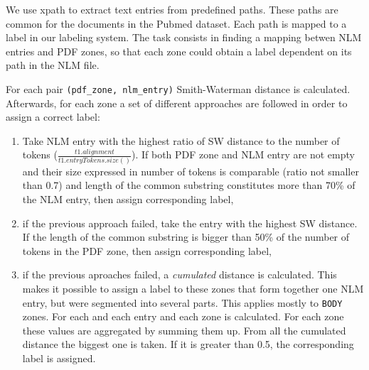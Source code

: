 We use xpath to extract text entries from predefined paths. These paths are common for the documents in the Pubmed dataset. Each path is mapped to a label in our labeling system. The task consists in finding a mapping betwen NLM entries and PDF zones, so that each zone could obtain a label dependent on its path in the NLM file.

For each pair \verb+(pdf_zone, nlm_entry)+ Smith-Waterman distance
is calculated. Afterwards, for each zone a set of different approaches are followed in order to assign a correct label:
\begin{enumerate}
\item Take NLM entry with the highest ratio of SW distance to the number of tokens ($\frac{t1.alignment}{t1.entryTokens.size()}$). If both PDF zone and NLM entry are not empty and their size expressed in number of tokens is comparable (ratio not smaller than 0.7) and length of the common substring constitutes more than 70\% of the NLM entry, then assign corresponding label,
\item if the previous approach failed, take the entry with the highest SW distance. If the length of the common substring is bigger than 50\% of the number of tokens in the PDF zone, then assign corresponding label,
\item if the previous aproaches failed, a \textit{cumulated} distance is calculated. This makes it possible to assign a label to these zones that form together one NLM entry, but were segmented into several parts. This applies mostly to \verb+BODY+ zones. For each and each entry and each zone is calculated. For each zone these values are aggregated by summing them up. From all the cumulated distance the biggest one is taken. If it is greater than 0.5, the corresponding label is assigned.
\end{enumerate}
